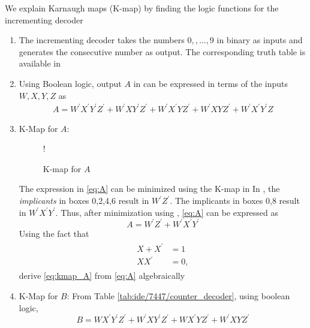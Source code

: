 We explain Karnaugh maps (K-map) by finding the
logic functions for the incrementing decoder
%
\begin{enumerate}[label=\arabic*.,ref=\theenumi]
%
	\item The incrementing decoder   takes the numbers $0,,\dots,9$ in binary as inputs and generates
the consecutive number as output.  The corresponding truth table is available in 
%
%
\item Using Boolean logic, output $A$  in  can be expressed in terms of the inputs $W,X,Y,Z$ as
\begin{align}
\label{eq:A}
A = W^{\prime}X^{\prime}Y^{\prime}Z^{\prime} + W^{\prime}XY^{\prime}Z^{\prime}
+W^{\prime}X^{\prime}YZ^{\prime}
+W^{\prime}XYZ^{\prime}
+W^{\prime}X^{\prime}Y^{\prime}Z
\end{align}
\item K-Map for $A$: 
\begin{figure}[!htb]
	\centering
\resizebox {0.5\columnwidth} {!} {

}
\caption{K-map for $A$}
\label{fig:kmap_A}
\end{figure}
%
The expression in \eqref{eq:A}  can be minimized using the K-map in 
In ,  the {\em implicants} in boxes 0,2,4,6 result in $W^{\prime}Z^{\prime}$.  The implicants in
boxes 0,8 result in $W^{\prime}X^{\prime}Y^{\prime}$.  Thus, after minimization using ,  \eqref{eq:A} can be expressed as
%
\begin{equation}
\label{eq:kmap_A}
A = W^{\prime}Z^{\prime}+W^{\prime}X^{\prime}Y^{\prime}
\end{equation}
%
Using the fact that
\begin{align}
\label{eq:boolean}
\begin{split}
X+X^{\prime} &= 1
\\
XX^{\prime} &= 0,
\end{split}
\end{align}
%
derive \eqref{eq:kmap_A} from \eqref{eq:A} algebraically
%
%
\item K-Map for $B$:
From Table \ref{tab:ide/7447/counter_decoder}, using boolean logic,
\begin{equation}
\label{eq:B}
B = WX^{\prime}Y^{\prime}Z^{\prime} + W^{\prime}XY^{\prime}Z^{\prime}
+WX^{\prime}YZ^{\prime}
+W^{\prime}XYZ^{\prime}
\end{equation}

\end{enumerate}
